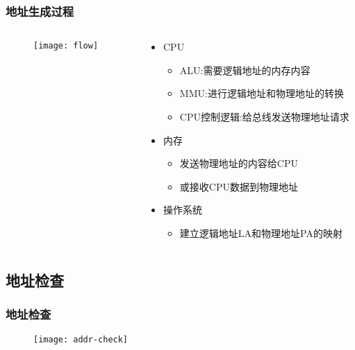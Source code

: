 \begin{frame}[plain,t]
    
    \frametitle{地址生成过程}
    
	\begin{columns}
	    \begin{column}{0.5\textwidth}
		    \begin{figure}
		        \centering
		        \texttt{[image: flow]}
		    \end{figure}
	    \end{column}
	    \begin{column}{0.5\textwidth}
			\begin{itemize}
			    \item CPU
			    \begin{itemize}
			        \item ALU:需要逻辑地址的内存内容
			        \item MMU:进行逻辑地址和物理地址的转换
			        \item CPU控制逻辑:给总线发送物理地址请求
			    \end{itemize}
			    \item 内存
			    \begin{itemize}
			        \item 发送物理地址的内容给CPU
			        \item 或接收CPU数据到物理地址
			    \end{itemize}
			    \item 操作系统
			    \begin{itemize}
			        \item 建立逻辑地址LA和物理地址PA的映射
			    \end{itemize}
			\end{itemize}
	    \end{column}
	\end{columns}
    
\end{frame}
\subsection{地址检查} %
\begin{frame}[plain,t]
    
    \frametitle{地址检查}
    
    \begin{figure}
        \centering
        \texttt{[image: addr-check]}
    \end{figure}
    
\end{frame}


